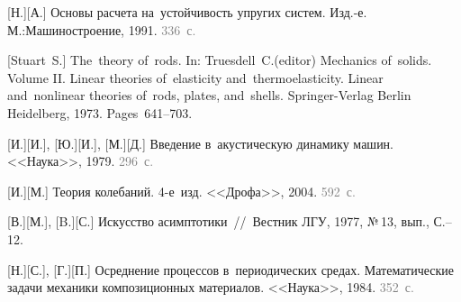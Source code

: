 \vspace*{10mm}


\newcommand\howmanypages[1]{\textcolor{gray}{#1}}

\newcommand\mirpublisher{<<Мир>>} %
\newcommand\naukapublisher{<<Наука>>} %
\newcommand\fizmatgiz{М.:\;Физ\-мат\-гиз}

\begin{thebibliography}{123}
\small

\thispagestyle{empty}


\begin{otherlanguage}{russian}

[Н.][А.] Основы расчета на~устойчивость упругих систем. Изд.\hbox{-}е. М.:\;Машино\-строение, 1991. \howmanypages{336~с.}

[Stuart~S.] The~theory of~rods. In: Truesdell~C.\:(editor) Mechanics of~solids. Volume II. Linear theories of~elasticity and~thermoelasticity. Linear and~nonlinear theories of~rods, plates, and~shells. Springer\hbox{-}Verlag Berlin Heidelberg, 1973. Pages~641\hbox{--}703.

[И.][И.], [Ю.][И.], [М.][Д.] Введение в~акустическую динамику машин. \naukapublisher, 1979. \howmanypages{296~с.}

[И.][М.] Теория колебаний. 4\hbox{-}е~изд. <<Дрофа>>, 2004. \howmanypages{592~с.}

[В.][М.], [B.][С.] Искусство асимптотики~//~Вестник ЛГУ, 1977, №\,13, вып., С.\hbox{--}12.

[Н.][С.], [Г.][П.] Осреднение процессов в~периодических средах. Математические задачи механики композиционных материалов. \naukapublisher, 1984. \howmanypages{352~с.}


\end{otherlanguage}
\end{thebibliography}
